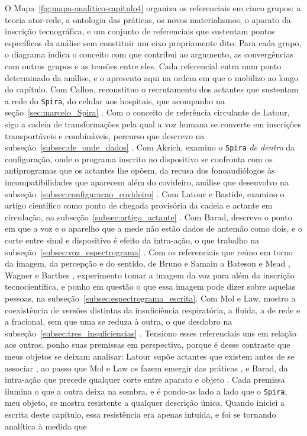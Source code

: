 O Mapa~\ref{fig:mapa-analitico-capitulo4} organiza os referenciais em cinco grupos: a teoria ator-rede, a ontologia das práticas, os novos materialismos, o aparato da inscrição tecnográfica, e um conjunto de referenciais que sustentam pontos específicos da análise sem constituir um eixo propriamente dito. Para cada grupo, o diagrama indica o conceito com que contribui ao argumento, as convergências com outros grupos e as tensões entre eles. Cada referencial entra num ponto determinado da análise, e o apresento aqui na ordem em que o mobilizo ao longo do capítulo. Com Callon, reconstituo o recrutamento dos actantes que sustentam a rede do \texttt{Spira}, do celular aos hospitais, que acompanho na seção~\ref{sec:marcelo_Spira} \parencite{Callon1986Sociology}. Com o conceito de referência circulante de Latour, sigo a cadeia de transformações pela qual a voz humana se converte em inscrições transportáveis e combináveis, percurso que descrevo na subseção~\ref{subsec:de_onde_dados} \parencite{Latour2017Esperanca}. Com Akrich, examino o \texttt{Spira} \textit{de dentro} da configuração, onde o programa inscrito no dispositivo se confronta com os antiprogramas que os actantes lhe opõem, da recusa dos fonoaudiólogos às incompatibilidades que aparecem além do covideiro, análise que desenvolvo na subseção~\ref{subsec:configuracao_covideiro} \parencite{Akrich1992Description,AkrichLatour1992Convenient}. Com Latour e Bastide, examino o artigo científico como ponto de chegada provisória da cadeia e actante em circulação, na subseção~\ref{subsec:artigo_actante} \parencite{LatourBastide1986Writing,Law1986Laboratories}. Com Barad, descrevo o ponto em que a voz e o aparelho que a mede não estão dados de antemão como dois, e o corte entre sinal e dispositivo é efeito da intra-ação, o que trabalho na subseção~\ref{subsec:voz_espectrograma} \parencite{Barad2007Meeting}. Com os referenciais que reúno em torno da imagem, da percepção e do sentido, de Bruno \parencite{Bruno2019Tese} e Samain \parencite{Samain2012Pensam,Samain2000Balinese} a Bateson e Mead \parencite{BatesonMead1942}, Wagner \parencite{Wagner2018Simbolos} e Barthes \parencite{Barthes1984}, experimento tomar a imagem da voz para além da inscrição tecnocientífica, e ponho em questão o que essa imagem pode dizer sobre aquelas pessoas, na subseção~\ref{subsec:espectrograma_escrita}. Com Mol e Law, mostro a coexistência de versões distintas da insuficiência respiratória, a fluida, a de rede e a fracional, sem que uma se reduza à outra, o que desdobro na subseção~\ref{subsec:tres_insuficiencias} \parencite{mol2002body,Law2004After}. Tensiono esses referenciais uns em relação aos outros, ponho suas premissas em perspectiva, porque é desse contraste que meus objetos se deixam analisar: Latour supõe actantes que existem antes de se associar \parencite{Latour2011CienciaEmAcao}, ao passo que Mol e Law os fazem emergir das práticas \parencite{mol2002body,Law2004After}, e Barad, da intra-ação que precede qualquer corte entre aparato e objeto \parencite{Barad2007Meeting}. Cada premissa ilumina o que a outra deixa na sombra, e é pondo-as lado a lado que o \texttt{Spira}, meu objeto, se mostra resistente a qualquer descrição única. Quando iniciei a escrita deste capítulo, essa resistência era apenas intuída, e foi se tornando analítica à medida que 